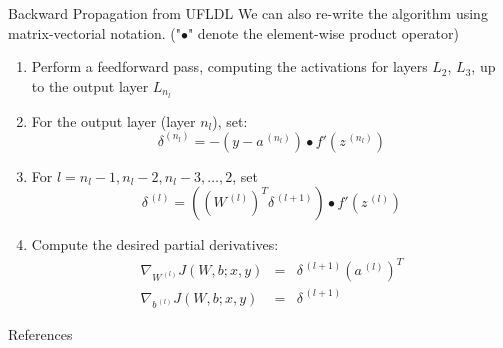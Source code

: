 \documentclass[10pt]{beamer}
\begin{document}
	\begin{frame}{Backward Propagation from UFLDL}
		We can also re-write the algorithm using matrix-vectorial notation. ("$\bullet$" denote the element-wise product operator)
		\begin{enumerate}
			\item Perform a feedforward pass, computing the activations for layers $L_2$, $L_3$, up to the output layer $L_{n_l}$
			\item For the output layer (layer $n_l$), set:
			$$\delta^(n_l)=-(y-a^{\,(n_l)})\bullet f'(z^{\,(n_l)})$$
			\item For $l=n_l-1, n_l-2, n_l-3,\dots,2$, set
			$$\delta^{\,(l)}=\left((W^{\,(l)})^T\delta^{\,(l+1)}\right)\bullet f'(z^{\,(l)})$$
			\item Compute the desired partial derivatives:
			\begin{eqnarray}
				\nabla_{W^{\,(l)}}J(W,b;x,y)&=&\delta^{\,(l+1)}(a^{\,(l)})^T\\
				\nabla_{b^{\,(l)}}J(W,b;x,y)&=&\delta^{\,(l+1)}
			\end{eqnarray}
		\end{enumerate}
	\end{frame}


	\begin{frame}[allowframebreaks]{References}
		
		
	\end{frame}
\end{document}
